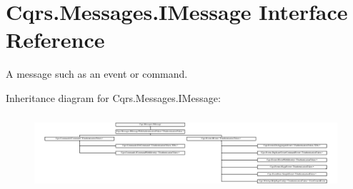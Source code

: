 \hypertarget{interfaceCqrs_1_1Messages_1_1IMessage}{}\section{Cqrs.\+Messages.\+I\+Message Interface Reference}
\label{interfaceCqrs_1_1Messages_1_1IMessage}


A message such as an event or command.  


Inheritance diagram for Cqrs.\+Messages.\+I\+Message\+:\begin{figure}[H]
\begin{center}
\leavevmode
\includegraphics[height=2.812500cm]{interfaceCqrs_1_1Messages_1_1IMessage}
\end{center}
\end{figure}
